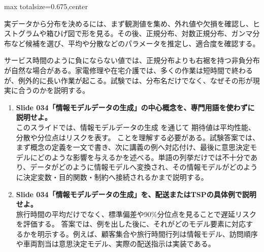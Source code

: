 \begin{adjustbox}{max totalsize={\textwidth}{0.675\textheight},center}
\begin{minipage}{\textwidth}
\begin{minipage}[t]{0.485\textwidth}
実データから分布を決めるには、まず観測値を集め、外れ値や欠損を確認し、ヒストグラムや箱ひげ図で形を見る。その後、正規分布、対数正規分布、ガンマ分布など候補を選び、平均や分散などのパラメータを推定し、適合度を確認する。\par
サービス時間のように負にならない値では、正規分布よりも右裾を持つ非負分布が自然な場合がある。家電修理や在宅介護では、多くの作業は短時間で終わるが、例外的に長い作業が起こる。試験では、分布名だけでなく、なぜその形が現実に合うのかを説明する。\par
{}
\begin{enumerate}
\item \textbf{Slide 034「情報モデルデータの生成」の中心概念を、専門用語を使わずに説明せよ。}\\このスライドでは、情報モデルデータの生成 を通じて 期待値は平均性能、分散や分位点はリスクを表す。 ことを理解する必要がある。試験答案では、まず概念の定義を一文で書き、次に講義の例へ対応付け、最後に意思決定モデルにどのような影響を与えるかを述べる。単語の列挙だけでは不十分であり、データがどのように情報モデルへ変換され、その情報モデルがどのように決定変数・目的関数・制約へ接続されるかまで説明する。
\item \textbf{Slide 034「情報モデルデータの生成」を、配送またはTSPの具体例で説明せよ。}\\旅行時間の平均だけでなく、標準偏差や90\%分位点を見ることで遅延リスクを評価する。 答案では、例を出した後に、それがどのモデル要素に対応するかを明示する。例えば、顧客集合や旅行時間行列は情報モデル、訪問順序や車両割当は意思決定モデル、実際の配送指示は実装である。
\end{enumerate}
\end{minipage}
\end{minipage}
\end{adjustbox}

